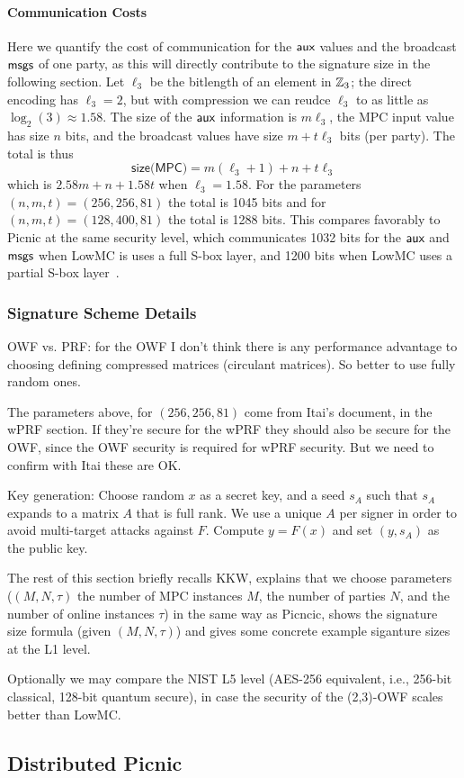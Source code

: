 \paragraph{Communication Costs}
Here we quantify the cost of communication for the $\textsf{aux}$ values and the broadcast $\textsf{msgs}$ of one party,
as this will directly contribute to the signature size in the following section. 
Let $\ell_3$ be the bitlength of an element in $\mathbb{Z}_3$; the direct encoding has
$\ell_3 = 2$, but with compression we can reudce $\ell_3$ to as little as
$\log_2(3) \approx 1.58$.    The size of the
$\textsf{aux}$ information is $m\ell_3$, the MPC input value has size $n$ bits, 
and the broadcast values have size $m + t\ell_3$ bits (per party). 
The total is thus 
\[\textsf{size(MPC)} = m(\ell_3 + 1) + n + t\ell_3 \]
which is $2.58m + n + 1.58t$ when $\ell_3 = 1.58$. 
For the parameters $(n,m,t) = (256, 256, 81)$ the total is 1045 bits and for
$(n,m,t)=(128, 400, 81)$ the total is 1288 bits.  This compares favorably to
Picnic at the same security level, which communicates 1032 bits for the $\textsf{aux}$
and $\textsf{msgs}$ when LowMC is uses a full S-box layer, and 1200 bits when LowMC
uses a partial S-box layer~\cite{TCHES:KalZav20}. 

\subsubsection{Signature Scheme Details}

OWF vs. PRF: for the OWF I don't think there is any performance advantage to
choosing defining compressed matrices (circulant matrices). So better to use
fully random ones. 

The parameters above, for $(256,256,81)$ come from Itai's document, in the wPRF
section.  If they're secure for the wPRF they should also be secure for the
OWF, since the OWF security is required for wPRF security. But we need to
confirm with Itai these are OK.  

Key generation: Choose random $x$ as a secret key, and a seed $s_A$ such that
$s_A$ expands to a matrix $A$ that is full rank.  We use a unique $A$ per
signer in order to avoid multi-target attacks against $F$. Compute $y = F(x)$
and set $(y, s_A)$ as the public key. 

The rest of this section briefly recalls KKW, explains that we choose
parameters ($(M, N, \tau)$ the number of MPC instances $M$, the number of
parties $N$, and the number of online instances $\tau$) in the same way as
Picncic, shows the signature size formula (given $(M, N, \tau)$) and gives some
concrete example siganture sizes at the L1 level. 

Optionally we may compare the NIST L5 level (AES-256 equivalent, i.e., 256-bit
classical, 128-bit quantum secure), in case the security of the (2,3)-OWF
scales better than LowMC. 



\subsection{Distributed Picnic}
